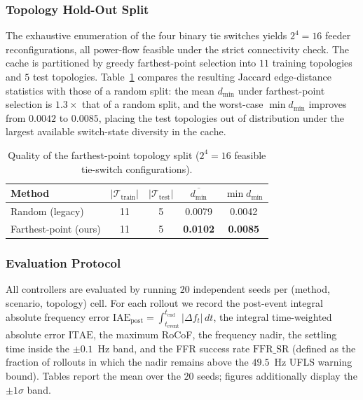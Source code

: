 \subsubsection{Topology Hold-Out Split}
The exhaustive enumeration of the four binary tie switches yields
$2^{4}=16$ feeder reconfigurations, all power-flow feasible under the
strict connectivity check. The cache is partitioned by greedy
farthest-point selection into $11$ training topologies and $5$ test
topologies. Table~\ref{tab:split_quality} compares the resulting
Jaccard edge-distance statistics with those of a random split: the
mean $d_{\min}$ under farthest-point selection is $1.3\times$ that of
a random split, and the worst-case $\min d_{\min}$ improves from
$0.0042$ to $0.0085$, placing the test topologies out of distribution
under the largest available switch-state diversity in the cache.

\begin{table}[!t]
\caption{Quality of the farthest-point topology split
($2^{4}=16$ feasible tie-switch configurations).}
\label{tab:split_quality}
\centering
\footnotesize
\begin{tabular}{lcccc}
\toprule
Method & $|\mathcal{T}_{\mathrm{train}}|$ & $|\mathcal{T}_{\mathrm{test}}|$ &
$\overline{d_{\min}}$ & $\min d_{\min}$ \\
\midrule
Random (legacy)        & 11 & 5 & 0.0079 & 0.0042 \\
Farthest-point (ours)  & 11 & 5 & \textbf{0.0102} & \textbf{0.0085} \\
\bottomrule
\end{tabular}
\end{table}

\subsubsection{Evaluation Protocol}
All controllers are evaluated by running $20$ independent seeds per
(method, scenario, topology) cell. For each rollout we record the
post-event integral absolute frequency error
$\mathrm{IAE}_{\mathrm{post}}=\!\int_{t_{\mathrm{event}}}^{t_{\mathrm{end}}}
|\Delta f_t|\,dt$, the integral time-weighted absolute error
$\mathrm{ITAE}$, the maximum RoCoF, the frequency nadir, the
settling time inside the $\pm 0.1$~Hz band, and the FFR success rate
$\mathrm{FFR\_SR}$ (defined as the fraction of rollouts in which the
nadir remains above the $49.5$~Hz UFLS warning bound). Tables report
the mean over the $20$ seeds; figures additionally display the
$\pm 1\sigma$ band.

